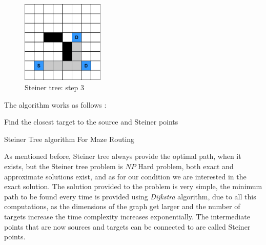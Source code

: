     \begin{figure}[H]
        \centering
        \includegraphics[width=0.35\textwidth]{figures/Steiner Stages/steiner_3.png}
        \caption{Steiner tree: step 3}
        \label{fig:steiner_3}
    \end{figure}

    The algorithm works as follows \cite{SteinerRef}:
    
    \begin{algorithm}
        \SetAlgoLined
        Find the closest target to the source and Steiner points\;
         \caption{Steiner Tree algorithm For Maze Routing}
    \end{algorithm}
        
    As mentioned before, Steiner tree always provide the optimal path, when it exists,
    but the Steiner tree problem is $NP$ Hard problem, both exact and approximate solutions exist,
    and as for our condition we are interested in the exact solution.
    The solution provided to the problem is very simple, the minimum path to be found 
    every time is provided using \emph{Dijkstra} algorithm, due to all this computations, as the dimensions of the graph get larger and the number
    of targets increase the time complexity increases exponentially.
    The intermediate points that are now sources and targets can be connected to are called
    Steiner points.
